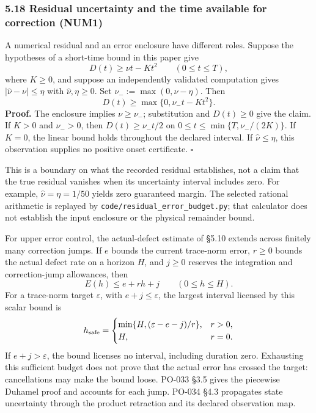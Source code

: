 \documentclass[
  11pt,
]{article}
\begin{document}
\subsubsection{5.18 Residual uncertainty and the time available for correction (NUM1)}\label{residual-uncertainty-and-the-time-available-for-correction-num1}

A numerical residual and an error enclosure have different roles. Suppose the hypotheses of a short-time bound in this paper give
\[
D(t)\ge \nu t-Kt^2\qquad(0\le t\le T),
\]
where \(K\ge0\), and suppose an independently validated computation gives
\(|\widehat\nu-\nu|\le\eta\) with \(\widehat\nu,\eta\ge0\).
Set \(\nu_-:=\max(0,\widehat\nu-\eta)\). Then
\[
D(t)\ge\max\{0,\nu_-t-Kt^2\}.
\]
\textbf{Proof.} The enclosure implies \(\nu\ge\nu_-\); substitution and \(D(t)\ge0\) give the claim. If \(K>0\) and \(\nu_->0\), then \(D(t)\ge\nu_-t/2\) on
\(0\le t\le\min\{T,\nu_-/(2K)\}\). If \(K=0\), the linear bound holds throughout the declared interval. If \(\widehat\nu\le\eta\), this observation supplies no positive onset certificate. \(\square\)

This is a boundary on what the recorded residual establishes, not a claim that the true residual vanishes when its uncertainty interval includes zero. For example, \(\widehat\nu=\eta=1/50\) yields zero guaranteed margin. The selected rational arithmetic is replayed by \texttt{code/residual\_error\_budget.py}; that calculator does not establish the input enclosure or the physical remainder bound.

For upper error control, the actual-defect estimate of §5.10 extends across finitely many correction jumps. If \(e\) bounds the current trace-norm error, \(r\ge0\) bounds the actual defect rate on a horizon \(H\), and \(j\ge0\) reserves the integration and correction-jump allowances, then
\[
E(h)\le e+rh+j\qquad(0\le h\le H).
\]
For a trace-norm target \(\varepsilon\), with \(e+j\le\varepsilon\), the largest interval licensed by this scalar bound is
\[
h_{\rm safe}=\begin{cases}
\min\{H,(\varepsilon-e-j)/r\},&r>0,\\
H,&r=0.
\end{cases}
\]
If \(e+j>\varepsilon\), the bound licenses no interval, including duration zero. Exhausting this sufficient budget does not prove that the actual error has crossed the target: cancellations may make the bound loose. PO-033 §3.5 gives the piecewise Duhamel proof and accounts for each jump. PO-034 §4.3 propagates state uncertainty through the product retraction and its declared observation map.
\end{document}
